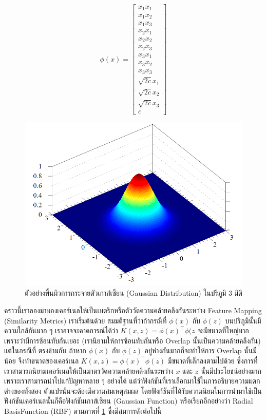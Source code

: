 \begin{equation}\label{eq:feature_map_ex2}
    \phi(x) = \begin{bmatrix}
        x_1 x_1\\
        x_1 x_2\\
        x_1 x_3\\
        x_2 x_1\\
        x_2 x_2\\
        x_2 x_3\\
        x_3 x_1\\
        x_3 x_2\\
        x_3 x_3\\
        \sqrt{2c}x_1\\
        \sqrt{2c}x_2\\
        \sqrt{2c}x_3\\
        c
    \end{bmatrix}
\end{equation}

\begin{figure}[htbp]
    \centering
    \includegraphics[width=0.9\linewidth]{fig/gaussian-3d.png}
    \caption{ตัวอย่างพื้นผิวการกระจายตัวเกาส์เซียน (Gaussian Distribution) ในปริภูมิ 3 มิติ}
    \label{fig:gaussian_3d}
\end{figure}

คราวนี้เราลองมามองเคอร์เนลให้เป็นเมตริกหรือตัววัดความคล้ายคลึงกันระหว่าง Feature Mapping (Similarity Metrics) เราเริ่มต้นด้วย%
สมมติฐานที่ว่าถ้ากรณีที่ $\phi(x)$ กับ $\phi(z)$ บนปริภูมินั้นมีความใกล้กันมาก ๆ เราอาจจะคาดการณ์ได้ว่า $K(x,z) = \phi(x)^{\top} 
\phi(z$ จะมีขนาดที่ใหญ่มากเพราะว่ามีการซ้อนทับกันเยอะ (เรานิยามให้การซ้อนทับกันหรือ Overlap นั้นเป็นความคล้ายคลึงกัน) แต่ในกรณีที่%
ตรงข้ามกัน ถ้าหาก $\phi(x)$ กับ $\phi(z)$ อยู่ห่างกันมากก็จะทำให้การ Overlap นั้นมีน้อย จึงทำขนาดของเคอร์เนล $K(x,z) = 
\phi(x)^{\top} \phi(z)$ มีขนาดที่เล็กลงตามไปด้วย ซึ่งการที่เราสามารถนิยามเคอร์เนลให้เป็นมาตรวัดความคล้ายคลึงกันระหว่าง $x$ และ 
$z$ นั้นมีประโยชน์อย่างมาก เพราะเราสามารถนำไปแก้ปัญหาหลาย ๆ อย่างได้ แต่ว่าฟังก์ชันที่เราเลือกมาใช้ในการอธิบายความแตกต่างของทั้งสอง%
ตัวแปรนั้นจะต้องมีความสมเหตุสมผล โดยฟังก์ชันที่ได้รับความนิยมในการนำมาใช้เป็นฟังก์ชันเคอร์เนลนั้นก็คือฟังก์ชันเกาส์เซียน (Gaussian 
Function) หรือเรียกอีกอย่างว่า Radial BasisFunction (RBF) ตามภาพที่ \ref{fig:gaussian_3d} ซึ่งมีสมการดังต่อไปนี้ 


